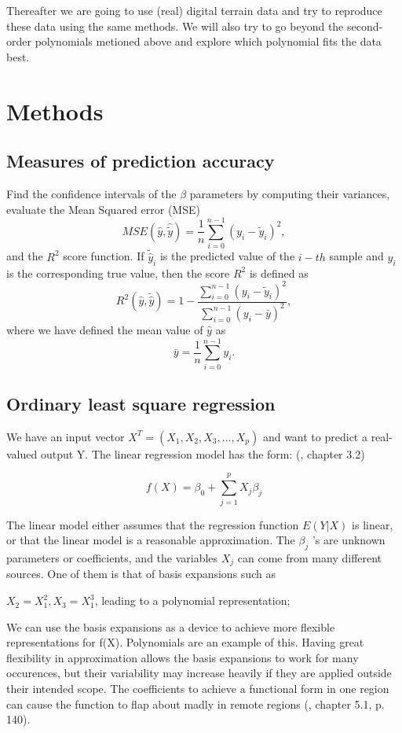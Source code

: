 Thereafter we are going to use (real) digital terrain data and try to
reproduce these data using the same methods. We will also try to go
beyond the second-order polynomials metioned above and explore 
which polynomial fits the data best.


\section{Methods}


\subsection{Measures of prediction accuracy}

Find the confidence intervals of the $\beta$ parameters by computing their variances, evaluate the Mean Squared error (MSE)
\[ MSE(\hat{y},\hat{\tilde{y}}) = \frac{1}{n}
\sum_{i=0}^{n-1}(y_i-\tilde{y}_i)^2, 
\] 
and the $R^2$ score function.
If $\tilde{\hat{y}}_i$ is the predicted value of the $i-th$ sample and $y_i$ is the corresponding true value, then the score $R^2$ is defined as
\[
R^2(\hat{y}, \tilde{\hat{y}}) = 1 - \frac{\sum_{i=0}^{n - 1} (y_i - \tilde{y}_i)^2}{\sum_{i=0}^{n - 1} (y_i - \bar{y})^2},
\]
where we have defined the mean value  of $\hat{y}$ as
\[
\bar{y} =  \frac{1}{n} \sum_{i=0}^{n - 1} y_i.
\]

\subsection{Ordinary least square regression}

We have an input vector $X^T = (X_1,X_2,X_3,...,X_p)$ and want to predict a real-valued output Y. The linear regression model has the form: (\cite{elementsstat}, chapter 3.2)

\begin{equation}
f(X) = \beta_0 + \sum_{j=1}^{p}X_j\beta_j
\end{equation}


The linear model either assumes that the regression function $E(Y |X)$ is
linear, or that the linear model is a reasonable approximation. The $\beta_j$ ’s are unknown parameters or coefficients, and the variables $X_j$ can come
from many different sources. One of them is that of basis expansions such as 

$X_2 = X_1^2, X_3 = X_1^3$, leading to a polynomial
representation;

We can use the basis expansions as a device to achieve more flexible representations for f(X). Polynomials are an example of this. Having great flexibility in approximation allows the basis expansions to work for many occurences, but their variability may increase heavily if they are applied outside their intended scope. The coefficients to achieve a functional form
in one region can cause the function to flap about madly in remote regions (\cite{elementsstat}, chapter 5.1, p. 140). 

